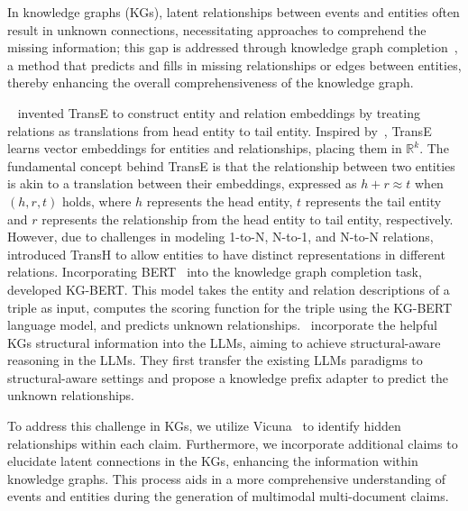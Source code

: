 In knowledge graphs (KGs), latent relationships between events and entities often result in unknown connections, necessitating approaches to comprehend the missing information; this gap is addressed through knowledge graph completion~\cite{SHEN2022109597,Lin_Liu_Sun_Liu_Zhu_2015,Shi_Weninger_2018}, a method that predicts and fills in missing relationships or edges between entities, thereby enhancing the overall comprehensiveness of the knowledge graph.

~\citet{NIPS2013_1cecc7a7} invented TransE to construct entity and relation embeddings by treating relations as translations from head entity to tail entity. Inspired by~\citet{mikolov2013distributed}, TransE learns vector embeddings for entities and relationships, placing them in $\mathbb{R}^k$. The fundamental concept behind TransE is that the relationship between two entities is akin to a translation between their embeddings, expressed as $h+r\approx t$ when $(h,r,t)$ holds, where $h$ represents the head entity, $t$ represents the tail entity and $r$ represents the relationship from the head entity to tail entity, respectively. However, due to challenges in modeling 1-to-N, N-to-1, and N-to-N relations,~\citet{10.5555/2893873.2894046} introduced TransH to allow entities to have distinct representations in different relations. Incorporating BERT~\cite{devlin2019bert} into the knowledge graph completion task,~\citet{yao2019kgbert} developed KG-BERT. This model takes the entity and relation descriptions of a triple as input, computes the scoring function for the triple using the KG-BERT language model, and predicts unknown relationships.~\citet{zhang2023making}  incorporate the helpful KGs structural information into the LLMs, aiming to achieve structural-aware reasoning in the LLMs. They first transfer the existing LLMs paradigms to structural-aware settings and propose a knowledge prefix adapter to predict the unknown relationships.

To address this challenge in KGs, we utilize Vicuna~\cite{vicuna2023} to identify hidden relationships within each claim. Furthermore, we incorporate additional claims to elucidate latent connections in the KGs, enhancing the information within knowledge graphs. This process aids in a more comprehensive understanding of events and entities during the generation of multimodal multi-document claims.
